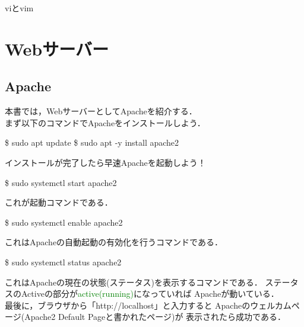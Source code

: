 \documentclass[dvipdfmx,a4paper,11pt]{jsbook}
\begin{document}
\begin{subbox}{viとvim}

\end{subbox}



\chapter{Webサーバー}
\section{Apache}
本書では，WebサーバーとしてApacheを紹介する．\\
まず以下のコマンドでApacheをインストールしよう．
\begin{tcolorbox}[terminalbox]
  \$ sudo apt update
  \$ sudo apt -y install apache2
\end{tcolorbox}
インストールが完了したら早速Apacheを起動しよう！
\begin{tcolorbox}[terminalbox]
  \$ sudo systemctl start apache2
\end{tcolorbox}
これが起動コマンドである．
\begin{tcolorbox}[terminalbox]
  \$ sudo systemctl enable apache2
\end{tcolorbox}
これはApacheの自動起動の有効化を行うコマンドである．
\begin{tcolorbox}[terminalbox]
  \$ sudo systemctl status apache2
\end{tcolorbox}
これはApacheの現在の状態(ステータス)を表示するコマンドである．
ステータスのActiveの部分が\textcolor{green}{active(running)}になっていれば
Apacheが動いている．\\
最後に，ブラウザから「http://localhost」と入力すると
Apacheのウェルカムページ(Apache2 Default Pageと書かれたページ)が
表示されたら成功である．
\end{document}
